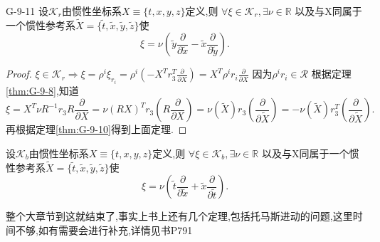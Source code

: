 \documentclass[../main.tex]{subfiles}
\begin{document}
\begin{theorem}{}{G-9-11}
  设$\mathscr{K}_{r}$由惯性坐标系$X \equiv \{t,x,y,z\}$定义,则 $\forall \xi \in \mathscr{K}_r,\exists \nu \in  \mathbb{R} $ 以及与X同属于一个惯性参考系$\tilde{X} = \{\tilde{t},\tilde{x},\tilde{y},\tilde{z}\}$使\[
    \xi = \nu(\tilde{y}\frac{\partial   }{\partial \tilde{x}} - \tilde{x}\frac{\partial   }{\partial \tilde{y}} ) 
  .\] 
\end{theorem}
\begin{proof}
  $\xi \in \mathscr{K}_r \Rightarrow \xi = \rho^i\xi_{r_i} = \rho^i(-X^Tr_3^T \frac{\partial   }{\partial X}) = X^T \rho^i r_i \frac{\partial   }{\partial X} $ 因为$\rho^ir_i \in \mathscr{R}$ 根据定理\ref{thm:G-9-8},知道 \[
    \xi =  X^T \nu R^{-1} r_3 R \frac{\partial   }{\partial X} = \nu (RX)^T r_3 (R \frac{\partial   }{\partial X}) = \nu (\tilde{X})r_3 (\frac{\partial   }{\partial \tilde{X}} ) = -\nu (\tilde{X})r_3^T (\frac{\partial   }{\partial \tilde{X}} )
  .\] 
  再根据定理\ref{thm:G-9-10}得到上面定理.
\end{proof}
 \begin{theorem}
   设$\mathscr{K}_{b}$由惯性坐标系$X \equiv \{t,x,y,z\}$定义,则 $\forall \xi \in \mathscr{K}_b,\exists \nu \in  \mathbb{R} $ 以及与X同属于一个惯性参考系$\tilde{X} = \{\tilde{t},\tilde{x},\tilde{y},\tilde{z}\}$使\[
    \xi = \nu(\tilde{t}\frac{\partial   }{\partial \tilde{x}} + \tilde{x}\frac{\partial   }{\partial \tilde{t}} ) 
  .\]  
 \end{theorem} 
 \begin{note}
   整个大章节到这就结束了,事实上书上还有几个定理,包括托马斯进动的问题,这里时间不够,如有需要会进行补充,详情见书P791
 \end{note}
\end{document}
